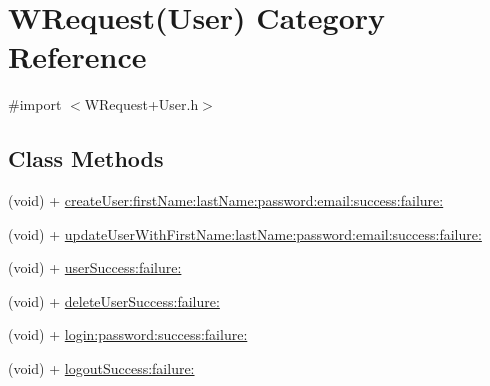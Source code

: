 \hypertarget{category_w_request_07_user_08}{\section{W\-Request(User) Category Reference}
\label{category_w_request_07_user_08}
}


{\ttfamily \#import $<$W\-Request+\-User.\-h$>$}

\subsection*{Class Methods}
\begin{DoxyCompactItemize}
\item 
(void) + \hyperlink{category_w_request_07_user_08_a676c38fde57d2f6d6d75927f220e9f4f}{create\-User\-:first\-Name\-:last\-Name\-:password\-:email\-:success\-:failure\-:}
\item 
(void) + \hyperlink{category_w_request_07_user_08_ae384a94e5842dcc05d87a35c7d485bc1}{update\-User\-With\-First\-Name\-:last\-Name\-:password\-:email\-:success\-:failure\-:}
\item 
(void) + \hyperlink{category_w_request_07_user_08_ad4e64a826bae67b6d8ae922583a9f781}{user\-Success\-:failure\-:}
\item 
(void) + \hyperlink{category_w_request_07_user_08_a852fffeb2c740551c1d07be57b6729e4}{delete\-User\-Success\-:failure\-:}
\item 
(void) + \hyperlink{category_w_request_07_user_08_aef5a097ed530f9aa8e56d8d26a4e958e}{login\-:password\-:success\-:failure\-:}
\item 
(void) + \hyperlink{category_w_request_07_user_08_a67f15d943515e3ff89ccf20ccd49ee5a}{logout\-Success\-:failure\-:}
\end{DoxyCompactItemize}



